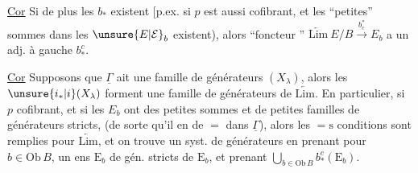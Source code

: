 \uline{Cor} Si de plus les $b_*$ existent 
[p.ex. si $p$ est aussi cofibrant, et les ``petites'' sommes
dans les $\unsure{E|\mathcal E}_b$ existent), alors  ``foncteur
'' $\underleftarrow{\mathrm{Lim}}\ E/B\xrightarrow{b_c^*}E_b$ a un adj. à
gauche $b_*^c$.

\uline{Cor} Supposons que $\underline{\Gamma}$ ait une  famille
de générateurs  $(X_\lambda)$, alors les $\unsure{i_*|i}(X_\lambda)$
forment une famille de générateurs  de
$\underleftarrow{\mathrm{Lim}}$. En particulier, si $p$ cofibrant, et si
les $E_b$ ont des petites sommes et de
petites familles de générateurs stricts, (de sorte
qu'il en  de $=$ dans $\underline{\Gamma}$), alors les $=\mathrm{s}$
conditions sont remplies pour $\underleftarrow{\mathrm{Lim}}$, et on trouve
un syst. de générateurs  en prenant pour 
$b\in\mathrm{Ob}\,B$, un ens $\mathrm E_b$ de gén. stricts de $\mathrm E_b$,
et prenant $\displaystyle\bigcup_{b\in\mathrm{Ob}\,B}b_*^c(\mathrm E_b)$.


